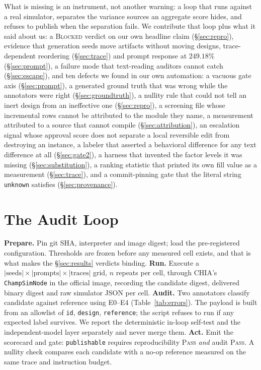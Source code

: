 \documentclass[10pt,twocolumn]{article}
\begin{document}
What is missing is an instrument, not another warning: a loop that runs against a
real simulator, separates the variance sources an aggregate score hides, and
refuses to publish when the separation fails. We contribute that loop plus what
it said about us: a \textsc{Blocked} verdict on our own headline claim
(\S\ref{sec:repro}), evidence that generation seeds move artifacts without
moving designs, trace-dependent reordering (\S\ref{sec:trace}) and prompt response
at $249.18\%$ (\S\ref{sec:prompt}), a failure mode that text-reading auditors cannot
catch (\S\ref{sec:escape}), and ten defects we found in our own automation: a
vacuous gate axis (\S\ref{sec:prompt}), a generated ground truth that was wrong
while the annotators were right (\S\ref{sec:groundtruth}), a nullity rule that could
not tell an inert design from an ineffective one (\S\ref{sec:repro}), a screening file
whose incremental rows cannot be attributed to the module they name, a measurement
attributed to a source that cannot compile (\S\ref{sec:attribution}), an
escalation signal whose approval score does not separate a local reversible edit from
destroying an instance, a labeler that asserted a behavioral difference for any text difference at all (\S\ref{sec:gate2}), a harness that invented the factor
levels it was missing (\S\ref{sec:substitution}), a ranking statistic that printed
its own fill value as a measurement (\S\ref{sec:trace}), and a commit-pinning gate
that the literal string \texttt{unknown} satisfies (\S\ref{sec:provenance}).

\section{The Audit Loop}
\label{sec:loop}

\textbf{Prepare.} Pin git SHA, interpreter and image digest; load the
pre-registered configuration. Thresholds are frozen before any measured cell
exists, and that is what makes the \S\ref{sec:results} verdicts binding. \textbf{Run.} Execute a
$|\text{seeds}|\times|\text{prompts}|\times|\text{traces}|$ grid, $n$ repeats per
cell, through CHIA's \texttt{ChampSimNode} in the official image, recording the
candidate digest, delivered binary digest and raw simulator JSON per cell.
\textbf{Audit.} Two annotators classify candidate against reference using E0--E4
(Table~\ref{tab:errors}). The payload is built from an allowlist of \texttt{id},
\texttt{design}, \texttt{reference}; the script refuses to run if any expected
label survives. We report the deterministic in-loop self-test and the
independent-model layer separately and never merge them. \textbf{Act.} Emit the
scorecard and gate: \texttt{publishable} requires reproducibility \textsc{Pass}
\emph{and} audit \textsc{Pass}. A nullity check compares each candidate with a
no-op reference measured on the same trace and instruction budget.
\end{document}
